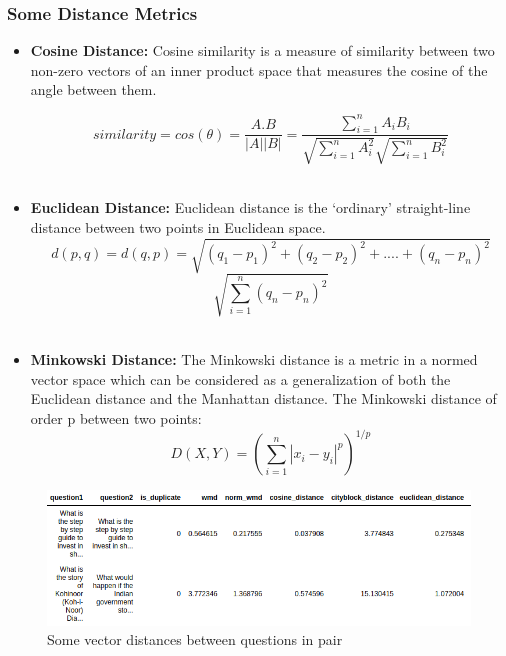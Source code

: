 \subsubsection{Some Distance Metrics}
\begin{itemize}
	\item \textbf{Cosine Distance:} Cosine similarity is a measure of similarity between two non-zero vectors of an inner product space that measures the cosine of the angle between them.

	\[similarity = cos(\theta) = \frac{A.B}{|A||B|}=\frac{\sum_{i=1}^n A_{i}B_{i}}{ \sqrt{\sum_{i=1}^n A_{i}^2} \sqrt{\sum_{i=1}^n B_{i}^2} }\] \\
	
	
	\item \textbf{Euclidean Distance:} Euclidean distance is the `ordinary' straight-line distance between two points in Euclidean space.
	\[ d(p,q) = d(q,p) = \sqrt{(q_1-p_1)^2 + (q_2-p_2)^2 +.... + (q_n-p_n)^2} \]
	\[ \sqrt{\sum_{i=1}^n(q_n-p_n)^2} \] \\
	
	\item \textbf{Minkowski Distance:} The Minkowski distance is a metric in a normed vector space which can be considered as a generalization of both the Euclidean distance and the Manhattan distance. The Minkowski distance of order p between two points:
	\[D(X,Y) = (\sum_{i=1}^n | x_i - y_i | ^p )^{1/p}\]

\end{itemize}

\begin{figure}[tbh]
\begin{center}
	\includegraphics[width=5.5in]{images/vector.png}
	\caption{Some vector distances between questions in pair}
	\label{vector}
\end{center}
\end{figure}

